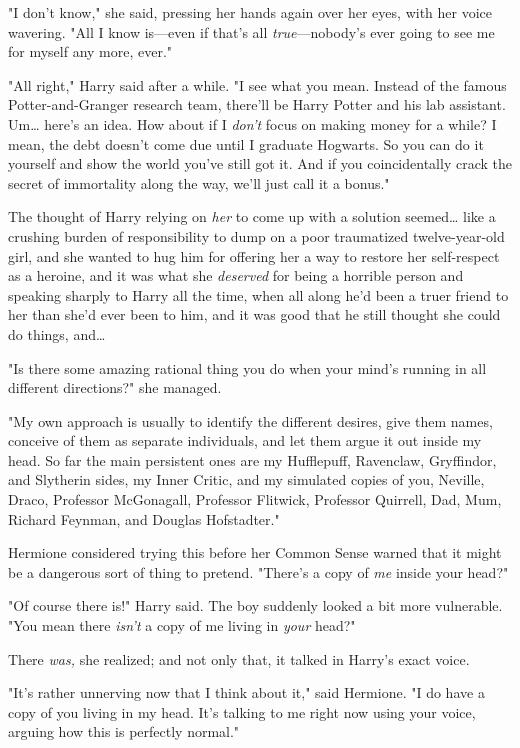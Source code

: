 "I don't know," she said, pressing her hands again over her eyes, with her
voice wavering. "All I know is---even if that's all \emph{true}---nobody's ever
going to see me for myself any more, ever."

"All right," Harry said after a while. "I see what you mean. Instead of the
famous Potter-and-Granger research team, there'll be Harry Potter and his lab
assistant. Um{\ldots} here's an idea. How about if I \emph{don't} focus on
making money for a while? I mean, the debt doesn't come due until I graduate
Hogwarts. So you can do it yourself and show the world you've still got it. And
if you coincidentally crack the secret of immortality along the way, we'll just
call it a bonus."

The thought of Harry relying on \emph{her} to come up with a solution
seemed{\ldots} like a crushing burden of responsibility to dump on a poor
traumatized twelve-year-old girl, and she wanted to hug him for offering her a
way to restore her self-respect as a heroine, and it was what she
\emph{deserved} for being a horrible person and speaking sharply to Harry all
the time, when all along he'd been a truer friend to her than she'd ever been
to him, and it was good that he still thought she could do things, and{\ldots}

"Is there some amazing rational thing you do when your mind's running in all
different directions?" she managed.

"My own approach is usually to identify the different desires, give them names,
conceive of them as separate individuals, and let them argue it out inside my
head. So far the main persistent ones are my Hufflepuff, Ravenclaw, Gryffindor,
and Slytherin sides, my Inner Critic, and my simulated copies of you, Neville,
Draco, Professor McGonagall, Professor Flitwick, Professor Quirrell, Dad, Mum,
Richard Feynman, and Douglas Hofstadter."

Hermione considered trying this before her Common Sense warned that it might be
a dangerous sort of thing to pretend. "There's a copy of \emph{me} inside your
head?"

"Of course there is!" Harry said. The boy suddenly looked a bit more
vulnerable. "You mean there \emph{isn't} a copy of me living in \emph{your}
head?"

There \emph{was,} she realized; and not only that, it talked in Harry's exact
voice.

"It's rather unnerving now that I think about it," said Hermione. "I do have a
copy of you living in my head. It's talking to me right now using your voice,
arguing how this is perfectly normal."

